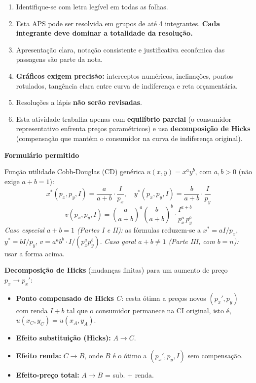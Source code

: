 \documentclass[11pt,addpoints]{exam}
\begin{document}
    \begin{enumerate}[noitemsep]
        \item Identifique-se com letra legível em todas as folhas.
        \item Esta APS pode ser resolvida em grupos de até 4 integrantes. \textbf{Cada integrante deve dominar a totalidade da resolução.}
        \item Apresentação clara, notação consistente e justificativa econômica das passagens são parte da nota.
        \item \textbf{Gráficos exigem precisão:} interceptos numéricos, inclinações, pontos rotulados, tangência clara entre curva de indiferença e reta orçamentária.
        \item Resoluções a lápis \textbf{não serão revisadas}.
        \item Esta atividade trabalha apenas com \textbf{equilíbrio parcial} (o consumidor representativo enfrenta preços paramétricos) e usa \textbf{decomposição de Hicks} (compensação que mantém o consumidor na curva de indiferença original).
    \end{enumerate}


    \vspace{0.5em}
    \noindent\hrulefill

    \noindent\textbf{Formulário permitido}
    \vspace{0.3em}

    Função utilidade Cobb-Douglas (CD) genérica $u(x,y) = x^a y^b$, com $a,b > 0$ (não exige $a+b=1$):
    \[
      x^*(p_x,p_y,I) = \frac{a}{a+b}\cdot\frac{I}{p_x},
      \quad
      y^*(p_x,p_y,I) = \frac{b}{a+b}\cdot\frac{I}{p_y}
    \]
    \[
      v(p_x,p_y,I) = \left(\frac{a}{a+b}\right)^{a}\!\left(\frac{b}{a+b}\right)^{b}\!\cdot \frac{I^{a+b}}{p_x^{a}\,p_y^{b}}
    \]
    \textit{Caso especial $a+b=1$ (Partes I e II):} as fórmulas reduzem-se a $x^* = a I/p_x$, $y^* = b I/p_y$, $v = a^a b^b\cdot I/(p_x^a p_y^b)$. \textit{Caso geral $a+b\neq 1$ (Parte III, com $b = n$):} usar a forma acima.

    \textbf{Decomposição de Hicks} (mudanças finitas) para um aumento de preço $p_x \to p_x'$:
    \begin{itemize}[noitemsep]
    \item \textbf{Ponto compensado de Hicks $C$}: cesta ótima a preços novos $(p_x', p_y)$ com renda $I+b$ tal que o consumidor permanece na CI original, isto é, $u(x_C, y_C) = u(x_A, y_A)$.
    \item \textbf{Efeito substituição (Hicks):} $A \to C$.
    \item \textbf{Efeito renda:} $C \to B$, onde $B$ é o ótimo a $(p_x', p_y, I)$ sem compensação.
    \item \textbf{Efeito-preço total:} $A \to B$ = sub. + renda.
    \end{itemize}
\end{document}
